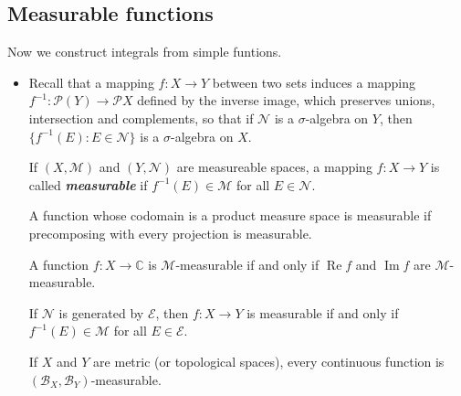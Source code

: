 \documentclass{article}
\theoremstyle{definition}
\numberwithin{equation}{section}
\newcommand{\C}{\mathbb{C}}
\begin{document}
		\subsection{Measurable functions}
		Now we construct integrals from simple funtions.
		
		\begin{itemize}
			\item Recall that a mapping $f:X\to Y$ between two sets induces a mapping $f^{-1}:\mathcal{P}(Y)\to\mathcal{P}X$ defined by the inverse image, which preserves unions, intersection and complements, so that if $\mathcal{N}$ is a $\sigma$-algebra on $Y$, then $\{f^{-1}(E):E\in\mathcal{N}\}$ is a $\sigma$-algebra on $X$.
			
			If $(X,\mathcal{M})$ and $(Y,\mathcal{N})$ are measureable spaces, a mapping $f:X\to Y$ is called \textbf{\textit{measurable}} if $f^{-1}(E)\in\mathcal{M}$ for all $E\in\mathcal{N}$.
			
			\begin{prop}
				A function whose codomain is a product measure space is measurable if precomposing with every projection is measurable.
			\end{prop}
			\begin{coro}
				A function $f:X\to\C$ is $\mathcal{M}$-measurable if and only if $\operatorname{Re} f$ and $\operatorname{Im} f$ are $\mathcal{M}$-measurable.
			\end{coro}
			
			\begin{prop}
				If $\mathcal{N}$ is generated by $\mathcal{E}$, then $f:X\to Y$ is measurable if and only if $f^{-1}(E)\in\mathcal{M}$ for all $E\in\mathcal{E}$.
			\end{prop}
			\begin{coro}
				If $X$ and $Y$ are metric (or topological spaces), every continuous function is $(\mathcal{B}_X,\mathcal{B}_Y)$-measurable.
			\end{coro}
			

\end{itemize}
\end{document}
